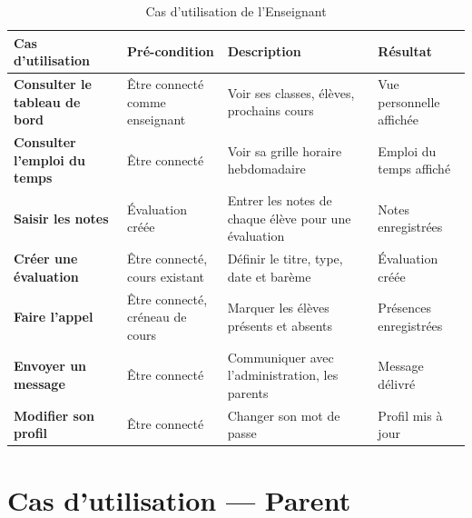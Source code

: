 \documentclass[12pt, a4paper, twoside, openright]{report}
\begin{document}
\begin{table}[htbp]
  \centering
  \caption{Cas d'utilisation de l'Enseignant}
  \small
  \begin{tabularx}{\textwidth}{>{\bfseries}p{3.5cm} p{3cm} X p{2.5cm}}
    \toprule
    \textbf{Cas d'utilisation} & \textbf{Pré-condition} & \textbf{Description} & \textbf{Résultat} \\
    \midrule
    Consulter le tableau de bord & Être connecté comme enseignant & Voir ses classes, élèves, prochains cours & Vue personnelle affichée \\
    Consulter l'emploi du temps & Être connecté & Voir sa grille horaire hebdomadaire & Emploi du temps affiché \\
    Saisir les notes & Évaluation créée & Entrer les notes de chaque élève pour une évaluation & Notes enregistrées \\
    Créer une évaluation & Être connecté, cours existant & Définir le titre, type, date et barème & Évaluation créée \\
    Faire l'appel & Être connecté, créneau de cours & Marquer les élèves présents et absents & Présences enregistrées \\
    Envoyer un message & Être connecté & Communiquer avec l'administration, les parents & Message délivré \\
    Modifier son profil & Être connecté & Changer son mot de passe & Profil mis à jour \\
    \bottomrule
  \end{tabularx}
\end{table}

\section{Cas d'utilisation — Parent}
\end{document}

